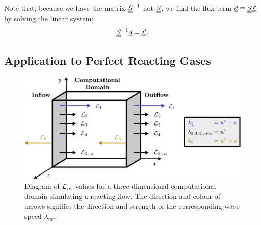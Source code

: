 Note that, because we have the matrix $\underline{\underline{S}}^{-1}$ not $\underline{\underline{S}}$, we find the flux term $\underline{d} \equiv \underline{\underline{S}}\underline{\mathcal{L}}$ by solving the linear system:
\begin{equation}
\underline{\underline{S}}^{-1} \underline{d} = \underline{\mathcal{L}}.
\end{equation}




\subsection{Application to Perfect Reacting Gases}

\begin{figure}[t]
\centering
\includegraphics[scale=0.6]{assets/imgs/NSCBC-L.pdf}
\caption{Diagram of $\mathcal{L}_m$ values for a three-dimensional computational domain simulating a reacting flow. The direction and colour of arrows signifies the direction and strength of the corresponding wave speed $λ_m$.}
\label{fig:NSCBC}
\end{figure}

